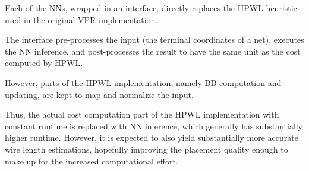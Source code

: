 Each of the \glspl{NN}, wrapped in an interface, directly replaces the \gls{HPWL} heuristic used in the original \gls{VPR} implementation.

The interface pre-processes the input (the terminal coordinates of a net), executes the \gls{NN} inference, and post-processes the result to have the same unit as the cost computed by \gls{HPWL}.

However, parts of the \gls{HPWL} implementation, namely \gls{BB} computation and updating, are kept to map and normalize the input.

Thus, the actual cost computation part of the \gls{HPWL} implementation with constant runtime is replaced with \gls{NN} inference, which generally has substantially higher runtime. However, it is expected to also yield substantially more accurate wire length estimations, hopefully improving the placement quality enough to make up for the increased computational effort.


